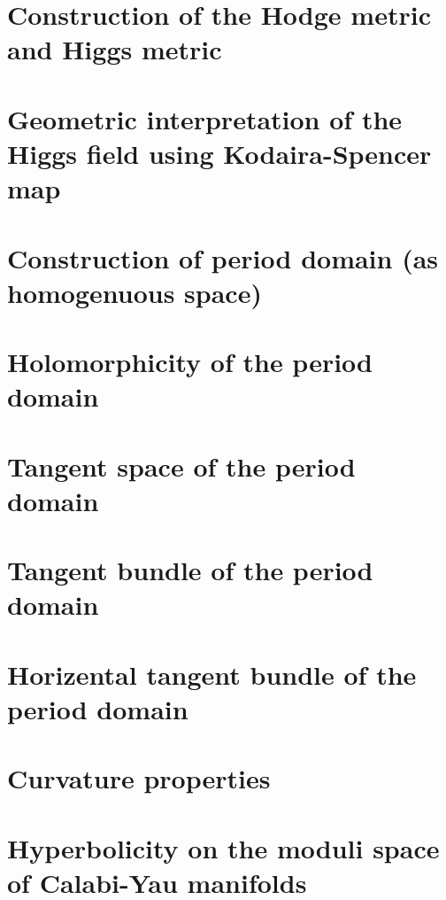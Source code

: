 \documentclass[11pt]{article}
\theoremstyle{definition}
\begin{document}
	\section{Construction of the Hodge metric and Higgs metric}
	
	\section{Geometric interpretation of the Higgs field using Kodaira-Spencer map}
	
	\section{Construction of period domain (as homogenuous space)}
	
	\section{Holomorphicity of the period domain}
	
	\section{Tangent space of the period domain}
	
	\section{Tangent bundle of the period domain}
	
	\section{Horizental tangent bundle of the period domain}
	
	\section{Curvature properties}
	
	\section{Hyperbolicity on the moduli space of Calabi-Yau manifolds}
	
\end{document}
